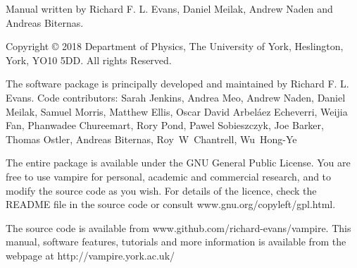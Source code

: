 \noindent Manual written by Richard F. L. Evans, Daniel Meilak, Andrew Naden and
Andreas Biternas.\\
\par
\noindent Copyright \copyright \xspace 2018 Department of Physics, The
University of York, Heslington, York, YO10 5DD. All rights Reserved.\\
\par
\noindent The \vampire software package is principally developed and maintained
by Richard F. L. Evans. Code contributors: Sarah Jenkins, Andrea Meo, Andrew Naden,
Daniel Meilak, Samuel Morris, Matthew Ellis, Oscar David Arbel\'aez Echeverri,
Weijia Fan, Phanwadee Chureemart, Rory Pond, Pawel Sobieszczyk, Joe Barker,
Thomas Ostler, Andreas Biternas, Roy~W~Chantrell, Wu~Hong-Ye\\
\par
\noindent The entire \vampire package is available under the GNU General
Public License. You are free to use vampire for personal, academic and
commercial research, and to modify the source code as you wish. For details of
the licence, check the README file in the source code or consult
www.gnu.org/copyleft/gpl.html.\\
\par
\noindent The \vampire source code is available from
www.github.com/richard-evans/vampire. This manual, software features, tutorials
and more information is available from the \vampire webpage at
http://vampire.york.ac.uk/\\
